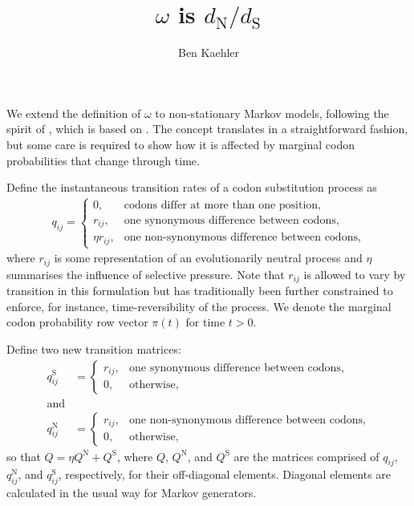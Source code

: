 \documentclass[a4paper,oneside,12pt]{article}
\begin{document}
\title{$\omega$ is $d_\text{N}/d_\text{S}$}
\author{Ben Kaehler}
\maketitle
We extend the definition of $\omega$ to non-stationary Markov models, following the spirit of \citet*[pp.~58-59]{yang2006computational}, which is based on \citet*{goldman1994codon}. The concept translates in a straightforward fashion, but some care is required to show how it is affected by marginal codon probabilities that change through time.

Define the instantaneous transition rates of a codon substitution process as
\begin{align*}
q_{ij} = \begin{cases} 0, &\text{codons differ at more than one position},\\
r_{ij}, &\text{one synonymous difference between codons},\\
\eta r_{ij}, &\text{one non-synonymous difference between codons},\end{cases}
\end{align*}
where $r_{ij}$ is some representation of an evolutionarily neutral process and $\eta$ summarises the influence of selective pressure. Note that $r_{ij}$ is allowed to vary by transition in this formulation but has traditionally been further constrained to enforce, for instance, time-reversibility of the process. We denote the marginal codon probability row vector $\pi(t)$ for time $t>0$.

Define two new transition matrices:
\begin{align*}
q_{ij}^\text{S} &= \begin{cases}
r_{ij}, &\text{one synonymous difference between codons},\\
0, &\text{otherwise},\end{cases} \\
\text{and} \\
q_{ij}^\text{N} &= \begin{cases}
r_{ij}, &\text{one non-synonymous difference between codons},\\
0, &\text{otherwise},\end{cases}
\end{align*}
so that $Q = \eta Q^\text{N} + Q^\text{S}$, where $Q$, $Q^\text{N}$, and $Q^\text{S}$ are the matrices comprised of $q_{ij}$, $q_{ij}^\text{N}$, and $q_{ij}^\text{S}$, respectively, for their off-diagonal elements. Diagonal elements are calculated in the usual way for Markov generators.
\end{document}
